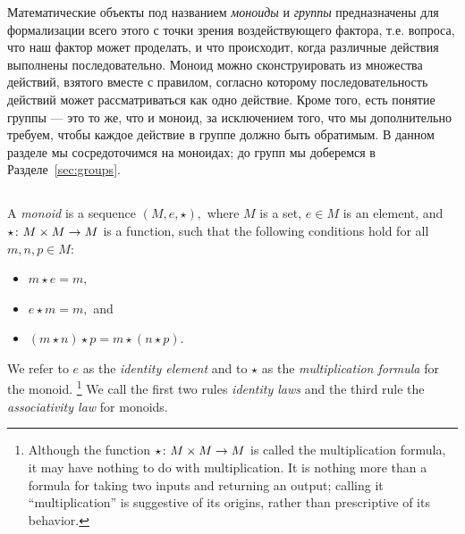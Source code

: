 \documentclass[../main/CT4S-EN-RU]{subfiles}
\begin{document}
\begin{blockRUS}
Математические объекты под названием {\em моноиды} и {\em группы} предназначены для формализации всего этого с точки зрения воздействующего фактора, т.е. вопроса, что наш фактор может проделать, и что происходит, когда различные действия выполнены последовательно. Моноид можно сконструировать из множества действий, взятого вместе с правилом, согласно которому последовательность действий может рассматриваться как одно действие. Кроме того, есть понятие группы — это то же, что и моноид, за исключением того, что мы дополнительно требуем, чтобы каждое действие в группе должно быть обратимым. В данном разделе мы сосредоточимся на моноидах; до групп мы доберемся в Разделе~\ref{sec:groups}.
\end{blockRUS}


\subsection{}

\begin{definitionENG}[Monoid]\label{def:monoid}
A {\em monoid} is a sequence $(M,e,\star),$ where $M$ is a set, $e\in M$ is an element, and $\star\colon M\times M\rightarrow M$ is a function, such that the following conditions hold for all $m,n,p\in M$:
\begin{itemize}
\item $m\star e=m,$
\item $e\star m=m,$ and
\item $(m\star n)\star p=m\star(n\star p).$
\end{itemize}
We refer to $e$ as the {\em identity element} and to $\star$ as the {\em multiplication formula} for the monoid.%
\footnote{Although the function $\star\colon M\times M\rightarrow M$ is called the multiplication formula, it may have nothing to do with multiplication. It is nothing more than a formula for taking two inputs and returning an output; calling it “multiplication” is suggestive of its origins, rather than prescriptive of its behavior.}
We call the first two rules {\em identity laws} and the third rule the {\em associativity law} for monoids.
\end{definitionENG}
\end{document}
